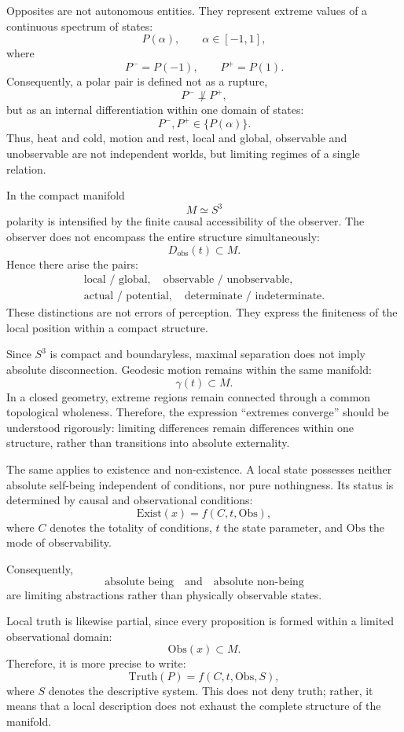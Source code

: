 \documentclass[12pt,a4paper]{article}
\theoremstyle{definition}
\begin{document}
Opposites are not autonomous entities. They represent extreme values of a continuous spectrum of states:
\[
P(\alpha),\qquad \alpha\in[-1,1],
\]
where
\[
P^- = P(-1),\qquad P^+ = P(1).
\]
Consequently, a polar pair is defined not as a rupture,
\[
P^-\not\perp P^+,
\]
but as an internal differentiation within one domain of states:
\[
P^-,P^+\in\{P(\alpha)\}.
\]
Thus, heat and cold, motion and rest, local and global, observable and unobservable are not independent worlds, but limiting regimes of a single relation.

In the compact manifold
\[
M\simeq S^3
\]
polarity is intensified by the finite causal accessibility of the observer. The observer does not encompass the entire structure simultaneously:
\[
D_{\mathrm{obs}}(t)\subset M.
\]
Hence there arise the pairs:
\begin{gather*}
\text{local / global},\quad
\text{observable / unobservable},\\
\text{actual / potential},\quad
\text{determinate / indeterminate}.
\end{gather*}
These distinctions are not errors of perception. They express the finiteness of the local position within a compact structure.

Since \(S^3\) is compact and boundaryless, maximal separation does not imply absolute disconnection. Geodesic motion remains within the same manifold:
\[
\gamma(t)\subset M.
\]
In a closed geometry, extreme regions remain connected through a common topological wholeness. Therefore, the expression ``extremes converge'' should be understood rigorously: limiting differences remain differences within one structure, rather than transitions into absolute externality.

The same applies to existence and non-existence. A local state possesses neither absolute self-being independent of conditions, nor pure nothingness. Its status is determined by causal and observational conditions:
\[
\mathrm{Exist}(x)=f(C,t,\mathrm{Obs}),
\]
where \(C\) denotes the totality of conditions, \(t\) the state parameter, and \(\mathrm{Obs}\) the mode of observability.

Consequently,
\[
\text{absolute being}
\quad\text{and}\quad
\text{absolute non-being}
\]
are limiting abstractions rather than physically observable states.

Local truth is likewise partial, since every proposition is formed within a limited observational domain:
\[
\mathrm{Obs}(x)\subset M.
\]
Therefore, it is more precise to write:
\[
\mathrm{Truth}(P)=f(C,t,\mathrm{Obs},S),
\]
where \(S\) denotes the descriptive system. This does not deny truth; rather, it means that a local description does not exhaust the complete structure of the manifold.
\end{document}
